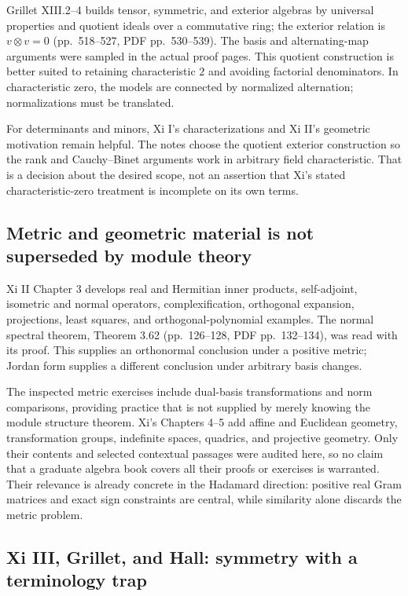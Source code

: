 \documentclass[
  11pt,
]{article}
\begin{document}
Grillet XIII.2--4 builds tensor, symmetric, and exterior algebras by
universal properties and quotient ideals over a commutative ring; the
exterior relation is \(v\otimes v=0\) (pp.~518--527, PDF pp.~530--539).
The basis and alternating-map arguments were sampled in the actual proof
pages. This quotient construction is better suited to retaining
characteristic \(2\) and avoiding factorial denominators. In
characteristic zero, the models are connected by normalized alternation;
normalizations must be translated.

For determinants and minors, Xi I's characterizations and Xi II's
geometric motivation remain helpful. The notes choose the quotient
exterior construction so the rank and Cauchy--Binet arguments work in
arbitrary field characteristic. That is a decision about the desired
scope, not an assertion that Xi's stated characteristic-zero treatment
is incomplete on its own terms.

\subsection{Metric and geometric material is not superseded by module
theory}\label{metric-and-geometric-material-is-not-superseded-by-module-theory}

Xi II Chapter 3 develops real and Hermitian inner products,
self-adjoint, isometric and normal operators, complexification,
orthogonal expansion, projections, least squares, and
orthogonal-polynomial examples. The normal spectral theorem, Theorem
3.62 (pp.~126--128, PDF pp.~132--134), was read with its proof. This
supplies an orthonormal conclusion under a positive metric; Jordan form
supplies a different conclusion under arbitrary basis changes.

The inspected metric exercises include dual-basis transformations and
norm comparisons, providing practice that is not supplied by merely
knowing the module structure theorem. Xi's Chapters 4--5 add affine and
Euclidean geometry, transformation groups, indefinite spaces, quadrics,
and projective geometry. Only their contents and selected contextual
passages were audited here, so no claim that a graduate algebra book
covers all their proofs or exercises is warranted. Their relevance is
already concrete in the Hadamard direction: positive real Gram matrices
and exact sign constraints are central, while similarity alone discards
the metric problem.

\subsection{Xi III, Grillet, and Hall: symmetry with a terminology
trap}\label{xi-iii-grillet-and-hall-symmetry-with-a-terminology-trap}
\end{document}
